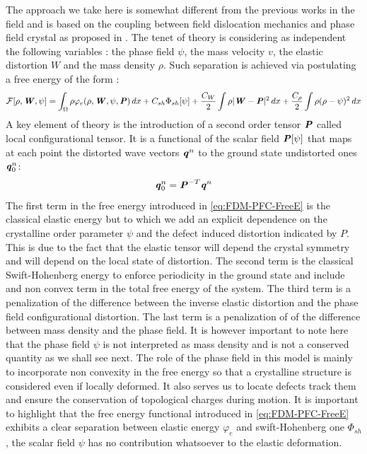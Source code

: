 \documentclass[11pt]{article}
\begin{document}
The approach we take here is somewhat different from the previous works in the field and is based on the coupling between field dislocation mechanics and phase field crystal as proposed in \parencite{acharyaFielddislocation2020}. The tenet of theory is considering as independent the following variables : the phase field $\psi$, the mass velocity $v$, the elastic distortion $W$ and the mass density $\rho$. Such separation is achieved via postulating a free energy of the form :
\begin{equation}\label{eq:FDM-PFC-FreeE}
    \mathcal{F}[\rho, \bm{\mathit{W}},\psi] = \int_\Omega \rho \varphi_e(\rho, \bm{\mathit{W}},\psi,\bm{\mathit{P}}) \, dx + C_{sh} \Phi_{sh}[\psi]+\frac{C_W}{2} \int \rho |\bm{\mathit{W}}-\bm{\mathit{P}}|^2 \, dx+ \frac{C_\rho}{2} \int \rho(\rho-\psi)^2 \, dx
\end{equation}
A key element of theory is the introduction of a second order tensor $ \bm{\mathit{P}}$ called local configurational tensor. It is a functional of the scalar field $\bm{\mathit{P}}[\psi]$ that maps at each point the distorted wave vectors $\bm{\mathit{q}}^n$ to the ground state undistorted ones $\bm{\mathit{q}}^n_0$:
\begin{equation}
    \bm{\mathit{q}}_0^n = \bm{\mathit{P}}^{-T} \bm{\mathit{q}}^n
\end{equation}
The first term in the free energy introduced in \cref{eq:FDM-PFC-FreeE} is the classical elastic energy but to which we add an explicit dependence on the crystalline order parameter $\psi$ and the defect induced distortion indicated by $P$. This is due to the fact that the elastic tensor will depend the crystal symmetry and will depend on the local state of distortion. The second term is the classical Swift-Hohenberg energy to enforce periodicity in the ground state and include and non convex term in the total free energy of the system. The third term is a penalization of the difference between the inverse elastic distortion and the phase field configurational distortion. The last term is a penalization of of the difference between mass density and the phase field. It is however important to note here that the phase field $\psi$ is not interpreted as mass density and is not a conserved quantity as we shall see next. The role of the phase field in this model is mainly to incorporate non convexity in the free energy so that a crystalline structure is considered even if locally deformed. It also serves us to locate defects track them and ensure the conservation of topological charges during motion. It is important to highlight that the free energy functional introduced in \cref{eq:FDM-PFC-FreeE} exhibits a clear separation between elastic energy $\varphi_e$ and swift-Hohenberg one $\Phi_{sh}$, the scalar field $\psi$ has no contribution whatsoever to the elastic deformation.\\
\end{document}
